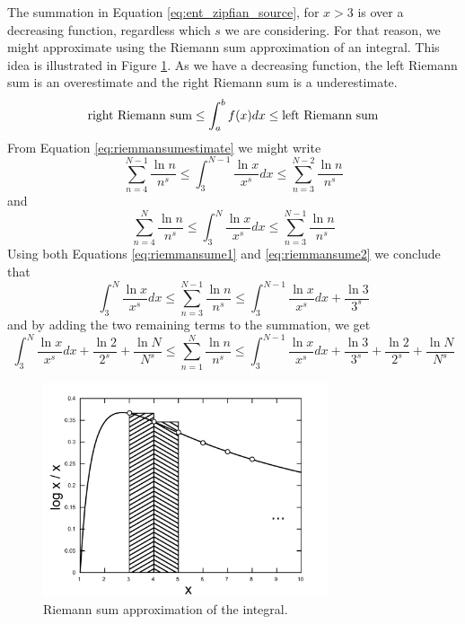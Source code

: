 The summation in Equation \ref{eq:ent_zipfian_source}, for $x > 3$ is over a decreasing
function, regardless which $s$ we are considering. For that reason, we might approximate
using the Riemann sum approximation of an integral. This idea is illustrated in 
Figure \ref{fig:logk_k_integral}. As we have a decreasing function, the left Riemann sum
is an overestimate and the right Riemann sum is a underestimate.
\begin{equation}
\label{eq:riemmansumestimate}
\textmd{right Riemann sum} \leq \int_{a}^{b} f(x) dx \leq \textmd{left Riemann sum}
\end{equation} 
From Equation \ref{eq:riemmansumestimate} we might write
\begin{equation}
\label{eq:riemmansume1}
\sum_{n=4}^{N-1} \frac{\ln n}{n^s} \leq \int_{3}^{N-1} \frac{\ln x}{x^s} dx \leq \sum_{n=3}^{N-2} \frac{\ln n}{n^s}
\end{equation}
and
\begin{equation}
\label{eq:riemmansume2}
\sum_{n=4}^{N} \frac{\ln n}{n^s} \leq \int_{3}^{N} \frac{\ln x}{x^s} dx \leq \sum_{n=3}^{N-1} \frac{\ln n}{n^s}
\end{equation}
Using both Equations \ref{eq:riemmansume1} and \ref{eq:riemmansume2} we conclude that
\begin{equation}
\label{eq:riemmansume12}
\int_{3}^{N} \frac{\ln x}{x^s} dx \leq \sum_{n=3}^{N-1} \frac{\ln n}{n^s} \leq \int_{3}^{N-1} \frac{\ln x}{x^s} dx + \frac{\ln 3}{3^s}
\end{equation}
and by adding the two remaining terms to the summation, we get
\begin{equation}
\label{eq:riemmansume12f}
\int_{3}^{N} \frac{\ln x}{x^s} dx + \frac{\ln 2}{2^s} + \frac{\ln N}{N^s} \leq \sum_{n=1}^{N} \frac{\ln n}{n^s} \leq \int_{3}^{N-1} \frac{\ln x}{x^s} dx + \frac{\ln 3}{3^s} + \frac{\ln 2}{2^s} + \frac{\ln N}{N^s}
\end{equation}


\begin{figure}[htbp]
\centering
\includegraphics[width=0.75\textwidth]{images/logk_k_integral.pdf}
\caption{Riemann sum approximation of the integral.}
\label{fig:logk_k_integral}
\end{figure}

